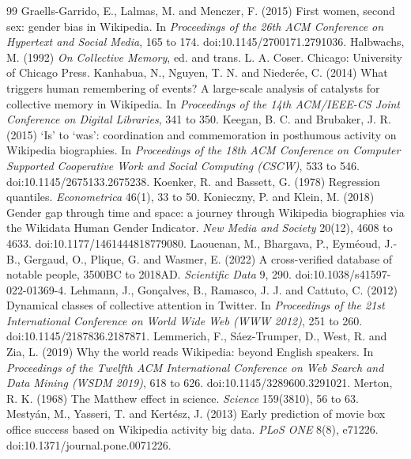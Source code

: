 \documentclass[11pt,a4paper]{article}
\begin{document}
\begin{thebibliography}{99}
 Graells-Garrido, E., Lalmas, M. and Menczer, F. (2015) First women, second sex: gender bias in Wikipedia. In \textit{Proceedings of the 26th ACM Conference on Hypertext and Social Media}, 165 to 174. doi:10.1145/2700171.2791036.
 Halbwachs, M. (1992) \textit{On Collective Memory}, ed. and trans. L. A. Coser. Chicago: University of Chicago Press.
 Kanhabua, N., Nguyen, T. N. and Niederée, C. (2014) What triggers human remembering of events? A large-scale analysis of catalysts for collective memory in Wikipedia. In \textit{Proceedings of the 14th ACM/IEEE-CS Joint Conference on Digital Libraries}, 341 to 350.
 Keegan, B. C. and Brubaker, J. R. (2015) `Is' to `was': coordination and commemoration in posthumous activity on Wikipedia biographies. In \textit{Proceedings of the 18th ACM Conference on Computer Supported Cooperative Work and Social Computing (CSCW)}, 533 to 546. doi:10.1145/2675133.2675238.
 Koenker, R. and Bassett, G. (1978) Regression quantiles. \textit{Econometrica} 46(1), 33 to 50.
 Konieczny, P. and Klein, M. (2018) Gender gap through time and space: a journey through Wikipedia biographies via the Wikidata Human Gender Indicator. \textit{New Media and Society} 20(12), 4608 to 4633. doi:10.1177/1461444818779080.
 Laouenan, M., Bhargava, P., Eyméoud, J.-B., Gergaud, O., Plique, G. and Wasmer, E. (2022) A cross-verified database of notable people, 3500BC to 2018AD. \textit{Scientific Data} 9, 290. doi:10.1038/s41597-022-01369-4.
 Lehmann, J., Gonçalves, B., Ramasco, J. J. and Cattuto, C. (2012) Dynamical classes of collective attention in Twitter. In \textit{Proceedings of the 21st International Conference on World Wide Web (WWW 2012)}, 251 to 260. doi:10.1145/2187836.2187871.
 Lemmerich, F., Sáez-Trumper, D., West, R. and Zia, L. (2019) Why the world reads Wikipedia: beyond English speakers. In \textit{Proceedings of the Twelfth ACM International Conference on Web Search and Data Mining (WSDM 2019)}, 618 to 626. doi:10.1145/3289600.3291021.
 Merton, R. K. (1968) The Matthew effect in science. \textit{Science} 159(3810), 56 to 63.
 Mestyán, M., Yasseri, T. and Kertész, J. (2013) Early prediction of movie box office success based on Wikipedia activity big data. \textit{PLoS ONE} 8(8), e71226. doi:10.1371/journal.pone.0071226.

\end{thebibliography}
\end{document}
